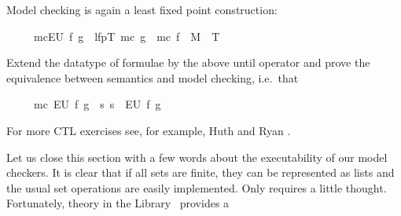 \begin{isabellebody}
\begin{isamarkuptext}
Model checking  is again a least fixed point construction:
\begin{isabelle}%
\ \ \ \ \ mc{}EU\ f\ g{}\ {}\ lfp{}{}T{}\ mc\ g\ {}\ mc\ f\ {}\ {}M{}\ {}{}\ T{}{}%
\end{isabelle}

\begin{exercise}
Extend the datatype of formulae by the above until operator
and prove the equivalence between semantics and model checking, i.e.\ that
\begin{isabelle}%
\ \ \ \ \ mc\ {}EU\ f\ g{}\ {}\ {}s{}\ s\ {}\ EU\ f\ g{}%
\end{isabelle}
\end{exercise}
For more CTL exercises see, for example, Huth and Ryan \cite{Huth-Ryan-book}.%
\end{isamarkuptext}%
\isamarkuptrue%
%
\isadelimproof
%
\endisadelimproof
%
\isatagproof
%
\endisatagproof
{\isafoldproof}%
%
\isadelimproof
%
\endisadelimproof
%
\isadelimproof
%
\endisadelimproof
%
\isatagproof
%
\endisatagproof
{\isafoldproof}%
%
\isadelimproof
%
\endisadelimproof
%
\isadelimproof
%
\endisadelimproof
%
\isatagproof
%
\endisatagproof
{\isafoldproof}%
%
\isadelimproof
%
\endisadelimproof
%
\begin{isamarkuptext}%
Let us close this section with a few words about the executability of
our model checkers.  It is clear that if all sets are finite, they can be
represented as lists and the usual set operations are easily
implemented. Only  requires a little thought.  Fortunately, theory
 in the Library~\cite{HOL-Library} provides a

\end{isamarkuptext}
\end{isabellebody}
